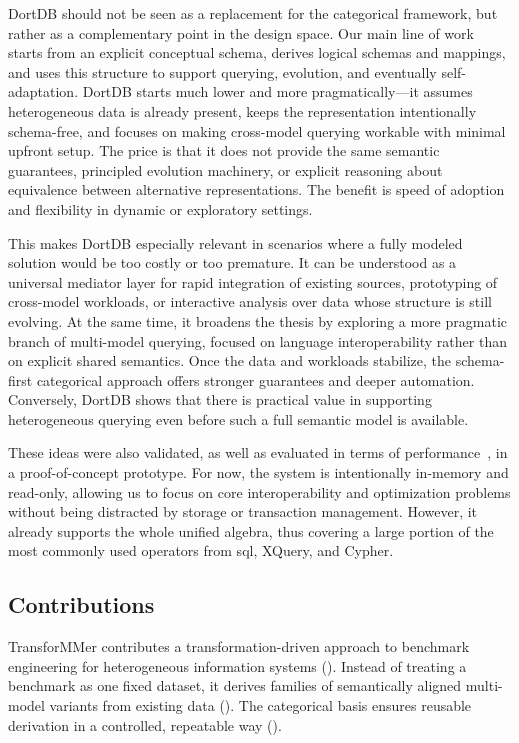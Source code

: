 DortDB should not be seen as a replacement for the categorical framework, but rather as a complementary point in the design space. Our main line of work starts from an explicit conceptual schema, derives logical schemas and mappings, and uses this structure to support querying, evolution, and eventually self-adaptation. DortDB starts much lower and more pragmatically---it assumes heterogeneous data is already present, keeps the representation intentionally schema-free, and focuses on making cross-model querying workable with minimal upfront setup. The price is that it does not provide the same semantic guarantees, principled evolution machinery, or explicit reasoning about equivalence between alternative representations. The benefit is speed of adoption and flexibility in dynamic or exploratory settings.

This makes DortDB especially relevant in scenarios where a fully modeled solution would be too costly or too premature. It can be understood as a universal mediator layer for rapid integration of existing sources, prototyping of cross-model workloads, or interactive analysis over data whose structure is still evolving. At the same time, it broadens the thesis by exploring a more pragmatic branch of multi-model querying, focused on language interoperability rather than on explicit shared semantics. Once the data and workloads stabilize, the schema-first categorical approach offers stronger guarantees and deeper automation. Conversely, DortDB shows that there is practical value in supporting heterogeneous querying even before such a full semantic model is available.

These ideas were also validated, as well as evaluated in terms of performance~\citep{jezek_2026}, in a proof-of-concept prototype. For now, the system is intentionally in-memory and read-only, allowing us to focus on core interoperability and optimization problems without being distracted by storage or transaction management. However, it already supports the whole unified algebra, thus covering a large portion of the most commonly used operators from \acrshort{sql}, XQuery, and Cypher.

\subsection{Contributions}

TransforMMer contributes a transformation-driven approach to benchmark engineering for heterogeneous information systems (). Instead of treating a benchmark as one fixed dataset, it derives families of semantically aligned multi-model variants from existing data (). The categorical basis ensures reusable derivation in a controlled, repeatable way ().

